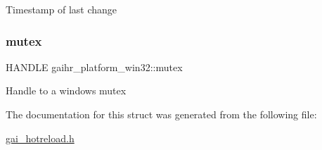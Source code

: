 Timestamp of last change \mbox{\label{structgaihr__platform__win32_a6119861cabb0b6251f23e90033780a82}} 
\subsubsection{\texorpdfstring{mutex}{mutex}}
{\footnotesize\ttfamily H\+A\+N\+D\+LE gaihr\+\_\+platform\+\_\+win32\+::mutex}

Handle to a windows mutex 

The documentation for this struct was generated from the following file\+:\begin{DoxyCompactItemize}
\item 
\hyperlink{gai__hotreload_8h}{gai\+\_\+hotreload.\+h}\end{DoxyCompactItemize}
